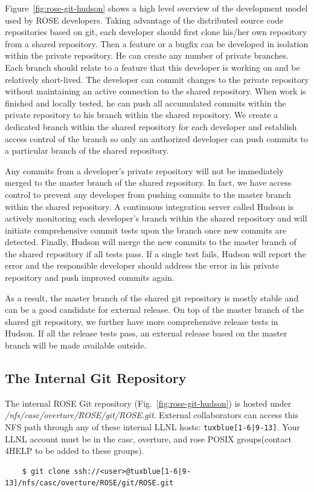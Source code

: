 Figure~\ref{fig:rose-git-hudson} shows a high level overview of the development model used by 
ROSE developers. Taking advantage of the distributed source code repositories based on git, 
each developer should first clone his/her own repository from a shared repository.
Then a feature or a bugfix can be developed in isolation within the private repository.
He can create any number of private branches. Each branch should relate to a
feature that this developer is working on and be relatively short-lived. 
The developer can commit changes to the private repository without
maintaining an active connection to 
the shared repository.  When work is finished and locally tested, he can push all accumulated commits within the private repository 
to his branch within the shared repository. 
We create a dedicated branch within the shared repository for each developer and establish access control of the
branch so only an authorized developer can push commits to a particular branch of the shared repository. 

Any commits from a developer's private repository will not be immediately merged to the master branch
of the shared repository. In fact, we have access control to prevent any developer from pushing commits 
to the master branch within the shared repository.
A continuous integration server called Hudson is actively monitoring each developer's branch within the shared repository 
and will initiate comprehensive commit tests upon the branch once new commits are detected.
Finally, Hudson will merge the new commits to the master branch of the shared repository if all tests pass.
If a single test fails, Hudson will report the error and the responsible developer should address the error in 
his private repository and push improved commits again. 

As a result, the master branch of the shared git repository is mostly
stable and can be a good candidate for external release. 
On top of the master branch of the shared git repository, we further have
more comprehensive release tests in Hudson. If all the release tests pass,
an external release based on the master branch will be made available
outside. 


\subsection{The Internal Git Repository}

The internal ROSE Git repository (Fig.~\ref{fig:rose-git-hudson}) is hosted under
\textit{/nfs/casc/overture/ROSE/git/ROSE.git}. External collaborators can access
this NFS path through any of these internal LLNL hosts: \texttt{tuxblue[1-6|9-13]}.
Your LLNL account must be in the casc, overture, and rose POSIX groups(contact
4HELP to be added to these groups).
\begin{verbatim}
    $ git clone ssh://<user>@tuxblue[1-6|9-13]/nfs/casc/overture/ROSE/git/ROSE.git
\end{verbatim}


